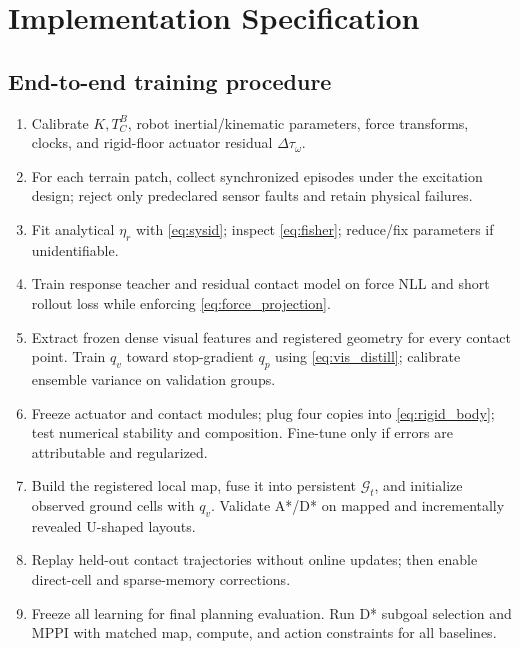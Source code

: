 \section{Implementation Specification}
\label{app:implementation}

\subsection{End-to-end training procedure}

\begin{tcolorbox}[colback=paper,colframe=blue,title={Algorithm 1: staged model construction},fonttitle=\bfseries\color{navy}]
\begin{enumerate}[leftmargin=1.8em]
  \item Calibrate $K,T_C^B$, robot inertial/kinematic parameters, force transforms, clocks, and rigid-floor actuator residual $\Delta\tau_\omega$.
  \item For each terrain patch, collect synchronized episodes under the excitation design; reject only predeclared sensor faults and retain physical failures.
  \item Fit analytical $\eta_r$ with \cref{eq:sysid}; inspect \cref{eq:fisher}; reduce/fix parameters if unidentifiable.
  \item Train response teacher and residual contact model on force NLL and short rollout loss while enforcing \cref{eq:force_projection}.
  \item Extract frozen dense visual features and registered geometry for every contact point. Train $q_v$ toward stop-gradient $q_p$ using \cref{eq:vis_distill}; calibrate ensemble variance on validation groups.
  \item Freeze actuator and contact modules; plug four copies into \cref{eq:rigid_body}; test numerical stability and composition. Fine-tune only if errors are attributable and regularized.
  \item Build the registered local map, fuse it into persistent $\mathcal G_t$, and initialize observed ground cells with $q_v$. Validate A*/D* on mapped and incrementally revealed U-shaped layouts.
  \item Replay held-out contact trajectories without online updates; then enable direct-cell and sparse-memory corrections.
  \item Freeze all learning for final planning evaluation. Run D* subgoal selection and MPPI with matched map, compute, and action constraints for all baselines.
\end{enumerate}
\end{tcolorbox}

